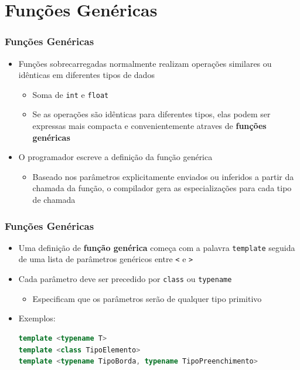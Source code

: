 \documentclass[aspectratio=169]{beamer}
\begin{document}
\section{Funções Genéricas}

\begin{frame}\frametitle{Funções Genéricas}
\begin{itemize}
	\item Funções sobrecarregadas normalmente realizam operações similares ou idênticas em diferentes tipos de dados
	\begin{itemize}
		\item Soma de \texttt{int} e \texttt{float}
		\item Se as operações são idênticas para diferentes tipos, elas podem ser expressas mais compacta e convenientemente atraves de \textbf{funções genéricas}
	\end{itemize}
	\item O programador escreve a definição da função genérica
	\begin{itemize}
		\item Baseado nos parâmetros explicitamente enviados ou inferidos a partir da chamada da função, o compilador gera as especializações para cada tipo de chamada
	\end{itemize}
\end{itemize}
\end{frame}

\begin{frame}[fragile]\frametitle{Funções Genéricas}
\begin{itemize}
	\item Uma definição de \textbf{função genérica} começa com a palavra \texttt{template} seguida de uma lista de parâmetros genéricos entre \texttt{\textless} e \texttt{\textgreater}
	\item Cada parâmetro deve ser precedido por \texttt{class} ou \texttt{typename}
	\begin{itemize}
		\item Especificam que os parâmetros serão de qualquer tipo primitivo
	\end{itemize}
	\item Exemplos:
\begin{lstlisting}[language=C++]
template <typename T>
template <class TipoElemento>
template <typename TipoBorda, typename TipoPreenchimento>
\end{lstlisting}
\end{itemize}
\end{frame}
\end{document}
